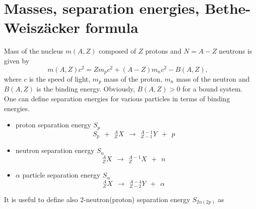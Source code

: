 \documentclass[graybox]{svmult}
\begin{document}
\section{Masses, separation energies, Bethe-Weiszäcker formula}
\label{sec:1}
Mass of the nucleus $m(A,Z)$ composed of $Z$ protons and $N=A-Z$ neutrons is given by
\begin{equation}
m(A,Z) c^2 = Z m_p c^2 + (A-Z) m_n c^2 - B(A,Z), 
\end{equation}
where $c$ is the speed of light, $m_p$ mass of the proton, $m_n$ mass of the neutron and $B(A,Z)$ is the binding energy. Obviously, $B(A,Z) > 0$ for a bound system. 
One can define separation energies for various particles in terms of binding energies. 
\begin{itemize}
    \item proton separation energy $S_p$
    \begin{equation*}
    S_p ~~+~~^{A}_ZX ~~\rightarrow~~  ^{A-1}_{Z-1}Y  ~~+~~ p 
    \end{equation*}
    \item neutron separation energy $S_n$
       \begin{equation*}
    ^{A}_ZX ~~\rightarrow~~  ^{A-1}_{Z}X  ~~+~~ n 
    \end{equation*}
    \item $\alpha$ particle separation energy $S_\alpha$
       \begin{equation*}
    ^{A}_ZX ~~\rightarrow~~  ^{A-4}_{Z-2}Y  ~~+~~ \alpha 
    \end{equation*}
\end{itemize}
It is useful to define also 2-neutron(proton) separation energy $S_{2n(2p)}$ as
\end{document}
